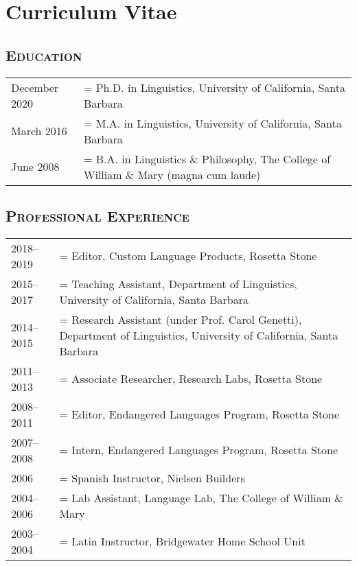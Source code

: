 \newlength{\datewidth}
\setlength{\datewidth}{6.5em}

\renewcommand{\arraystretch}{1.5}

\newenvironment{cvsection}[1]
{%
  \subsection*{\large\scshape#1}
  \vspace{-1em}
  \begin{longtabu} to \textwidth { p{\datewidth} >{\hangindent=\defaulthang}X[l] }
}
{\end{longtabu}}

\singlespacing

\section*{Curriculum Vitae}
\label{sec:cv}

\begin{center}
  \theauthor
\end{center}

\begin{cvsection}{Education}
  December 2020 & Ph.D. in Linguistics, University of California, Santa Barbara\\
  March 2016    & M.A. in Linguistics, University of California, Santa Barbara\\
  June 2008     & B.A. in Linguistics \& Philosophy, The College of William \& Mary (magna cum laude)
\end{cvsection}

\begin{cvsection}{Professional Experience}
  2018--2019 & Editor, Custom Language Products, Rosetta Stone\\
  2015--2017 & Teaching Assistant, Department of Linguistics, University of California, Santa Barbara\\
  2014--2015 & Research Assistant (under Prof. Carol Genetti), Department of Linguistics, University of California, Santa Barbara\\
  2011--2013 & Associate Researcher, Research Labs, Rosetta Stone\\
  2008--2011 & Editor, Endangered Languages Program, Rosetta Stone\\
  2007--2008 & Intern, Endangered Languages Program, Rosetta Stone\\
  2006       & Spanish Instructor, Nielsen Builders\\
  2004--2006 & Lab Assistant, Language Lab, The College of William \& Mary\\
  2003--2004 & Latin Instructor, Bridgewater Home School Unit
\end{cvsection}

